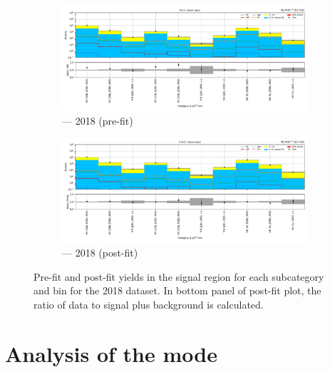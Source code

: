 \begin{figure}[htbp]
    \centering
    \begin{subfigure}[b]{0.9\textwidth}
        \includegraphics[width=\textwidth]{figures/mountain_ranges/2018/VH/SR_tree_prefit-abs_values_VH_cats.pdf}
        \caption{\VH --- 2018 (pre-fit)}
    \end{subfigure}

    \begin{subfigure}[b]{0.9\textwidth}
        \includegraphics[width=\textwidth]{figures/mountain_ranges/2018/VH/SR_tree_fit_s-abs_values_VH_cats.pdf}
        \caption{\VH --- 2018 (post-fit)}
    \end{subfigure}
    \caption[Pre-fit and post-fit yields in the signal region for each \VH subcategory and \ptmiss bin for the 2018 dataset]{Pre-fit and post-fit yields in the signal region for each \VH subcategory and \ptmiss bin for the 2018 dataset. In bottom panel of post-fit plot, the ratio of data to signal plus background is calculated.}
    \label{fig:htoinv_mountain_range_VH_2018}
\end{figure}

\clearpage




\section{Analysis of the \texorpdfstring{\ggH}{ggH} mode}
\label{sec:htoinv_analysis_ggF}

